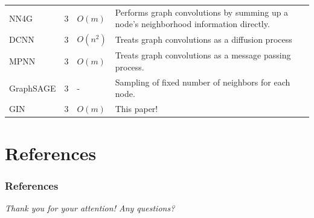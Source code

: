 \documentclass[handout]{beamer}
\begin{document}
\begin{frame}
{\begin{tabular}{|llll|}
\rowcolor{lightgray}
NN4G\cite{Micheli2009} & $3$ & $O(m)$ & Performs graph convolutions by summing up a node's neighborhood information directly.\\

DCNN\cite{Atwood2016} & $3$ & $O(n^2)$ & Treats graph convolutions as a diffusion process\\

\rowcolor{lightgray}
MPNN\cite{Gilmer2017} & $3$ & $O(m)$ & Treats graph convolutions as a message passing process.\\

GraphSAGE\cite{Hamilton2017} & $3$ & - & Sampling of fixed number of neighbors for each node.\\

\rowcolor{lightgray}
\alert{GIN}\cite{Xu2019} & $3$ & $O(m)$ & This paper!\\

\bottomrule
\end{tabular}
}

\end{frame}


\section{References}


\begin{frame}[allowframebreaks]
\frametitle{References}
\nocite{*}
\printbibliography
\end{frame}


\begin{frame}{}
  \centering \Large
  \emph{Thank you for your attention! Any questions?}
\end{frame}

\end{document}
